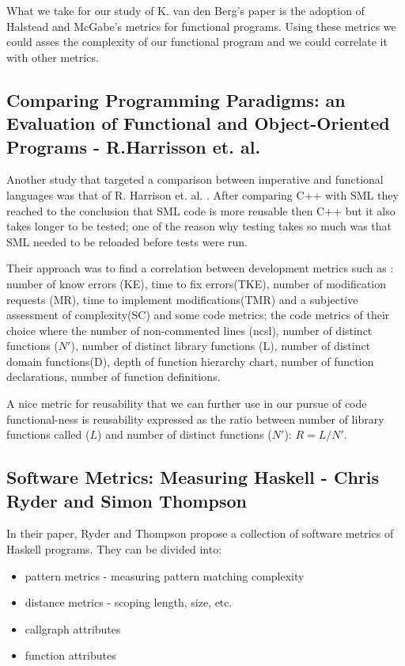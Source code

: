 \documentclass{article}
\begin{document}
What we take for our study of  K. van den Berg's paper is the adoption of Halstead and McGabe's metrics for functional programs. Using these metrics we could asses the complexity of our functional program and we could correlate it with other metrics. 

\subsection{Comparing Programming Paradigms: an Evaluation of Functional and Object-Oriented Programs - R.Harrisson et. al.}
Another study that targeted a comparison between imperative and functional languages was that of R. Harrison et. al. \cite{eps250597} . After comparing C++ with SML they reached to the conclusion that SML code is more reusable then C++ but it also takes longer to be tested; one of the reason why testing takes so much was that SML needed to be reloaded before tests were run. \par

Their approach was to find a correlation between development metrics such as : number of know errors (KE), time to fix errors(TKE), number of modification requests (MR), time to implement modifications(TMR) and a subjective assessment of complexity(SC) and some code metrics; the code metrics of their choice where the number of non-commented lines (ncsl), number of distinct functions ($N'$), number of distinct library functions (L), number of distinct domain functions(D), depth of function hierarchy chart, number of function declarations, number of function definitions. \par

A nice metric for reusability that we can further use in our pursue of code functional-ness is reusability expressed as the ratio between number of library functions called ($L$) and number of distinct functions ($N'$): $R = L / N'$. \par

\subsection{Software Metrics: Measuring Haskell - Chris Ryder and Simon Thompson}
In their paper, Ryder and Thompson propose a collection of software metrics of Haskell programs. They can be divided into:
\begin{itemize}
\item pattern metrics - measuring pattern matching complexity
\item distance metrics - scoping length, size, etc.
\item callgraph attributes 
\item function attributes
\end{itemize}
\end{document}
